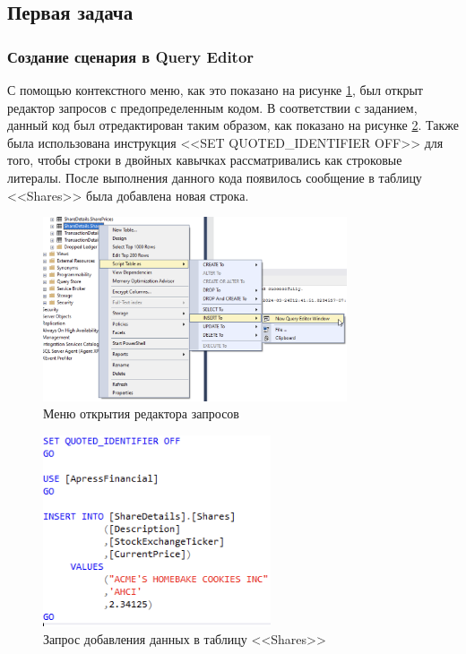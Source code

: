 \documentclass[a4paper, 14pt]{extarticle}
\begin{document}
\subsection{Первая задача}

\subsubsection{Создание сценария в Query Editor}

С помощью контекстного меню, как это показано на рисунке \ref{fig:task-1-1}, был
открыт редактор запросов с предопределенным кодом. В соответствии с заданием,
данный код был отредактирован таким образом, как показано на рисунке
\ref{fig:task-1-2}. Также была использована инструкция
<<\foreignlanguage{english}{SET QUOTED\_IDENTIFIER OFF}>> для того, чтобы строки
в двойных кавычках рассматривались как строковые литералы. После выполнения
данного кода появилось сообщение в таблицу <<\foreignlanguage{english}{Shares}>>
была добавлена новая строка.

\begin{figure}[H]
  \centering
  \includegraphics[width=0.8\textwidth]{images/task-1/1.png}
  \caption{Меню открытия редактора запросов}
  \label{fig:task-1-1}
\end{figure}

\begin{figure}[H]
  \centering
  \includegraphics[width=0.6\textwidth]{images/task-1/2.png}
  \caption{Запрос добавления данных в таблицу
  <<\foreignlanguage{english}{Shares}>>}
  \label{fig:task-1-2}
\end{figure}
\end{document}
